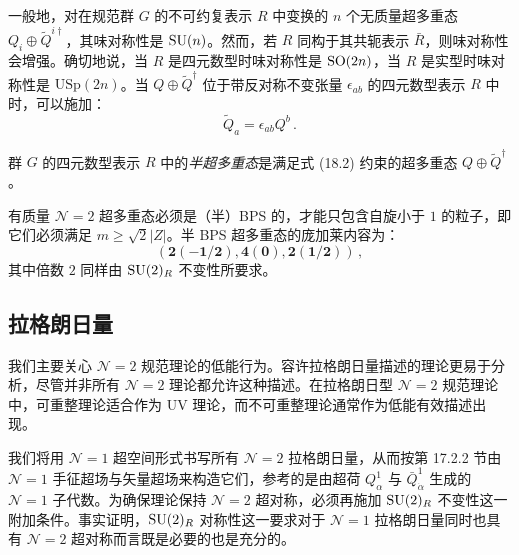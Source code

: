 
一般地，对在规范群 $G$ 的不可约复表示 $R$ 中变换的 $n$ 个无质量超多重态 $Q_i\oplus\tilde Q^{i\dagger}$，其味对称性是 $\operatorname{SU}(n)$。然而，若 $R$ 同构于其共轭表示 $\bar R$，则味对称性会增强。确切地说，当 $R$ 是四元数型时味对称性是 $\operatorname{SO}(2n)$，当 $R$ 是实型时味对称性是 $\mathrm{USp}(2n)$。当 $Q\oplus\tilde Q^\dagger$ 位于带反对称不变张量 $\epsilon_{ab}$ 的四元数型表示 $R$ 中时，可以施加：
\begin{equation}
\tilde Q_a=\epsilon_{ab}Q^b\,. \tag{18.2}
\end{equation}

\begin{definition}[18.1]
群 $G$ 的四元数型表示 $R$ 中的\emph{半超多重态}是满足式 (18.2) 约束的超多重态 $Q\oplus\tilde Q^\dagger$。
\end{definition}

有质量 $\mathcal N=2$ 超多重态必须是（半）BPS 的，才能只包含自旋小于 $1$ 的粒子，即它们必须满足 $m\ge\sqrt{2}|Z|$。半 BPS 超多重态的庞加莱内容为：
\[
(\mathbf{2}(\mathbf{-1/2}),\mathbf{4}(\mathbf{0}),\mathbf{2}(\mathbf{1/2}))\,,
\]
其中倍数 $2$ 同样由 $\operatorname{SU}(2)_R$ 不变性所要求。

\subsection{拉格朗日量}

我们主要关心 $\mathcal N=2$ 规范理论的低能行为。容许拉格朗日量描述的理论更易于分析，尽管并非所有 $\mathcal N=2$ 理论都允许这种描述。在拉格朗日型 $\mathcal N=2$ 规范理论中，可重整理论适合作为 UV 理论，而不可重整理论通常作为低能有效描述出现。

我们将用 $\mathcal N=1$ 超空间形式书写所有 $\mathcal N=2$ 拉格朗日量，从而按第 17.2.2 节由 $\mathcal N=1$ 手征超场与矢量超场来构造它们，参考的是由超荷 $Q^1_\alpha$ 与 $\bar Q^1_{\dot\alpha}$ 生成的 $\mathcal N=1$ 子代数。为确保理论保持 $\mathcal N=2$ 超对称，必须再施加 $\operatorname{SU}(2)_R$ 不变性这一附加条件。事实证明，$\operatorname{SU}(2)_R$ 对称性这一要求对于 $\mathcal N=1$ 拉格朗日量同时也具有 $\mathcal N=2$ 超对称而言既是必要的也是充分的。

